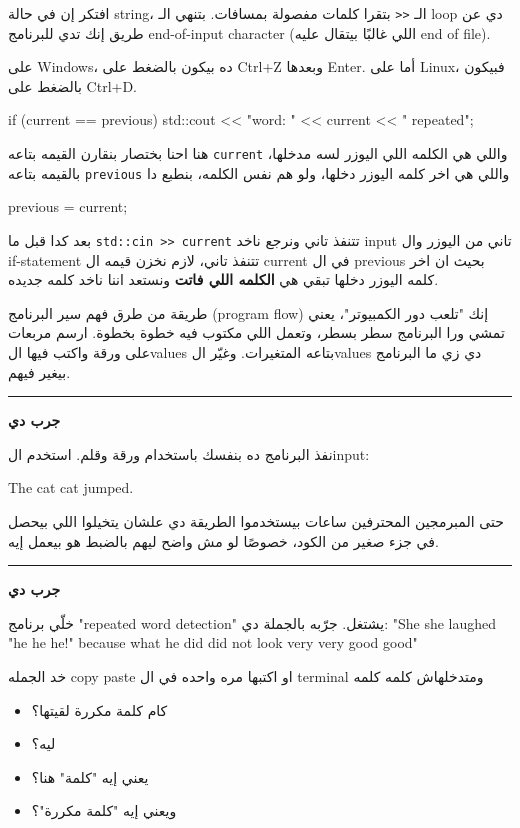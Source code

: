 \documentclass[11pt]{article}
\let\OriginalVerbatim\verbatim
\let\endOriginalVerbatim\endverbatim
\renewenvironment{verbatim}{\begin{english}\OriginalVerbatim}{\endOriginalVerbatim\end{english}}
\begin{document}
افتكر إن في حالة string، الـ \texttt{<{}<{}} بتقرا كلمات مفصولة بمسافات.
بتنهي الـ loop دي عن طريق إنك تدي للبرنامج end-of-input character (اللي غالبًا بيتقال عليه end of file).

على Windows، ده بيكون بالضغط على Ctrl+Z وبعدها Enter.
أما على Linux، فبيكون بالضغط على Ctrl+D.

\begin{verbatim}
if (current == previous) {
    std::cout << "word: " << current << " repeated\n";
}
\end{verbatim}

هنا احنا بختصار بنقارن القيمه بتاعه \texttt{current} واللي هي الكلمه اللي اليوزر لسه مدخلها، بالقيمه بتاعه \texttt{previous} واللي هي اخر كلمه اليوزر دخلها، ولو هم نفس الكلمه، بنطبع دا

\begin{verbatim}
previous = current;
\end{verbatim}

بعد كدا قبل ما \texttt{std::cin >{}>{} current} تتنفذ تاني ونرجع ناخد input تاني من اليوزر وال if-statement تتنفذ تاني، لازم نخزن قيمه ال current في ال previous بحيث ان اخر كلمه اليوزر دخلها تبقي هي \textbf{الكلمه اللي فاتت} ونستعد اننا ناخد كلمه جديده.

طريقة من طرق فهم سير البرنامج (program flow) إنك "تلعب دور الكمبيوتر"، يعني تمشي ورا البرنامج سطر بسطر، وتعمل اللي مكتوب فيه خطوة بخطوة.
ارسم مربعات على ورقة واكتب فيها الvalues بتاعه المتغيرات. وغيّر الvalues دي زي ما البرنامج بيغير فيهم.

\noindent\rule{\textwidth}{0.5pt}
\textbf{جرب دي}

نفذ البرنامج ده بنفسك باستخدام ورقة وقلم.
استخدم الinput:

\begin{verbatim}
The  
cat  
cat  
jumped.
\end{verbatim}

حتى المبرمجين المحترفين ساعات بيستخدموا الطريقة دي علشان يتخيلوا اللي بيحصل في جزء صغير من الكود، خصوصًا لو مش واضح ليهم بالضبط هو بيعمل إيه.

\noindent\rule{\textwidth}{0.5pt}
\textbf{جرب دي}

خلّي برنامج "repeated word detection" يشتغل.
جرّبه بالجملة دي:
"She she laughed "he he he!" because what he did did not look very very good good"

خد الجمله copy paste او اكتبها مره واحده في ال terminal ومتدخلهاش كلمه كلمه

\begin{itemize}
\item كام كلمة مكررة لقيتها؟
\item ليه؟
\item يعني إيه "كلمة" هنا؟
\item ويعني إيه "كلمة مكررة"؟
\end{itemize}
\end{document}
